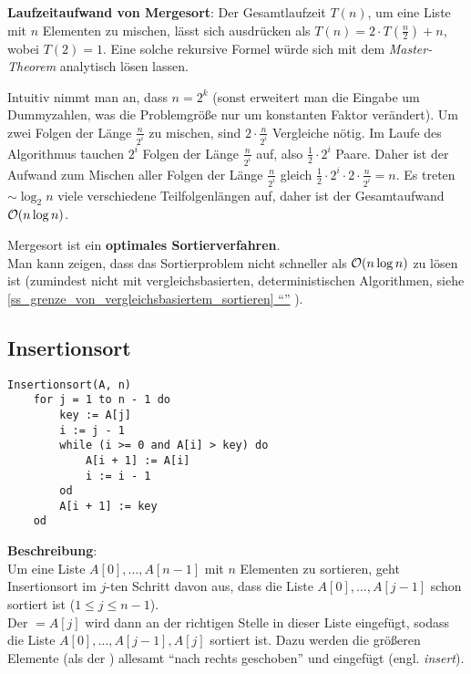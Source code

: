 \linie

\textbf{Laufzeitaufwand von Mergesort}: Der Gesamtlaufzeit $T(n)$, um
eine Liste mit $n$ Elementen zu mischen, lässt sich ausdrücken als
$T(n) = 2 \cdot T(\frac{n}{2}) + n$, wobei $T(2) = 1$.
Eine solche rekursive Formel würde sich mit dem \emph{Master-Theorem}
analytisch lösen lassen.

Intuitiv nimmt man an, dass $n = 2^k$ (sonst erweitert man die Eingabe um
Dummyzahlen, was die Problemgröße nur um konstanten Faktor verändert).
Um zwei Folgen der Länge $\frac{n}{2^i}$ zu mischen, sind
$2 \cdot \frac{n}{2^i}$ Vergleiche nötig.
Im Laufe des Algorithmus tauchen $2^i$ Folgen der Länge $\frac{n}{2^i}$ auf,
also $\frac{1}{2} \cdot 2^i$ Paare.
Daher ist der Aufwand zum Mischen aller Folgen der Länge $\frac{n}{2^i}$
gleich $\frac{1}{2} \cdot 2^i \cdot 2 \cdot \frac{n}{2^i} = n$.
Es treten $\sim \log_2 n$ viele verschiedene Teilfolgenlängen auf,
daher ist der Gesamtaufwand $\mathcal{O}(n \log n)$.

Mergesort ist ein \textbf{optimales Sortierverfahren}. \\
Man kann zeigen, dass das Sortierproblem nicht schneller als
$\mathcal{O}(n \log n)$ zu lösen ist
(zumindest nicht mit vergleichsbasierten, deterministischen Algorithmen,
siehe
\hyperref[ss_grenze_von_vergleichsbasiertem_sortieren]{%
    \autoref{ss_grenze_von_vergleichsbasiertem_sortieren}
    "`"'}%
).

\pagebreak

\subsection{%
    Insertionsort%
}

\begin{lstlisting}
Insertionsort(A, n)
    for j = 1 to n - 1 do
        key := A[j]
        i := j - 1
        while (i >= 0 and A[i] > key) do
            A[i + 1] := A[i]
            i := i - 1
        od
        A[i + 1] := key
    od
\end{lstlisting}

\textbf{Beschreibung}: \\
Um eine Liste $A[0], \ldots, A[n - 1]$ mit $n$ Elementen zu sortieren, geht
Insertionsort im $j$-ten Schritt davon aus, dass die
Liste $A[0], \ldots, A[j - 1]$
schon sortiert ist ($1 \le j \le n - 1$). \\
Der  $= A[j]$ wird dann an der richtigen Stelle in dieser Liste
eingefügt, sodass die Liste
$A[0], \ldots, A[j - 1], A[j]$ sortiert ist.
Dazu werden die größeren Elemente (als der ) allesamt
"`nach rechts geschoben"' und  eingefügt (engl. \emph{insert}).

